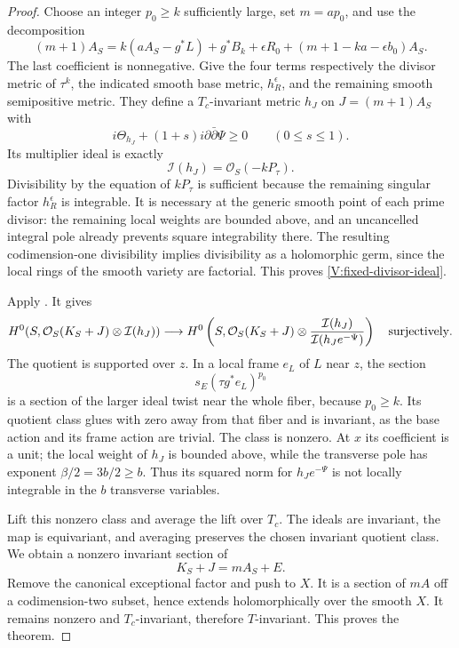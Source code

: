 \begin{proof}
Choose an integer $p_0\ge k$ sufficiently large, set $m=ap_0$, and
use the decomposition
\begin{equation}\label{V:invariant-metric-decomposition}
 (m+1)A_S
 =k(aA_S-g^*L)+g^*B_k+\epsilon R_0
        +(m+1-ka-\epsilon b_0)A_S.
\end{equation}
The last coefficient is nonnegative.  Give the four terms respectively
the divisor metric of $\tau^k$, the indicated smooth base metric,
$h_R^\epsilon$, and the remaining smooth semipositive metric.
They define a $T_c$-invariant metric $h_J$ on $J=(m+1)A_S$ with
\[
 i\Theta_{h_J}+(1+s)i\partial\bar\partial\Psi\ge0
 \qquad(0\le s\le1).
\]
Its multiplier ideal is exactly
\begin{equation}\label{V:fixed-divisor-ideal}
 \mathcal I(h_J)=\mathcal O_S(-kP_\tau).
\end{equation}
Divisibility by the equation of $kP_\tau$ is sufficient because the
remaining singular factor $h_R^\epsilon$ is integrable.  It is
necessary at the generic smooth point of each prime divisor: the
remaining local weights are bounded above, and an uncancelled
integral pole already prevents square integrability there.  The
resulting codimension-one divisibility implies divisibility as a
holomorphic germ, since the local rings of the smooth variety are
factorial.  This proves \eqref{V:fixed-divisor-ideal}.

Apply \cite[Theorem~1.1]{CDM2017}.  It gives
\[
 H^0\!\left(S,\mathcal O_S(K_S+J)\otimes\mathcal I(h_J)\right)
 \longrightarrow
 H^0\left(S,\mathcal O_S(K_S+J)\otimes
       \frac{\mathcal I(h_J)}{\mathcal I(h_Je^{-\Psi})}\right)
 \quad\hbox{surjectively}.
\]
The quotient is supported over $z$.  In a local frame $e_L$ of $L$
near $z$, the section
\[
 s_E(\tau g^*e_L)^{p_0}
\]
is a section of the larger ideal twist near the whole fiber, because
$p_0\ge k$.  Its quotient class glues with zero away from that fiber
and is invariant, as the base action and its frame action are trivial.
The class is nonzero.  At $x$ its coefficient is a unit; the local
weight of $h_J$ is bounded above, while the transverse pole has
exponent $\beta/2=3b/2\ge b$.  Thus its squared norm for
$h_Je^{-\Psi}$ is not locally integrable in the $b$ transverse
variables.

Lift this nonzero class and average the lift over $T_c$.
The ideals are invariant, the map is equivariant, and averaging
preserves the chosen invariant quotient class.  We obtain a nonzero
invariant section of
\[
 K_S+J=mA_S+E.
\]
Remove the canonical exceptional factor and push to $X$.
It is a section of $mA$ off a codimension-two subset, hence extends
holomorphically over the smooth $X$.  It remains nonzero and
$T_c$-invariant, therefore $T$-invariant.  This proves the theorem.
\end{proof}

